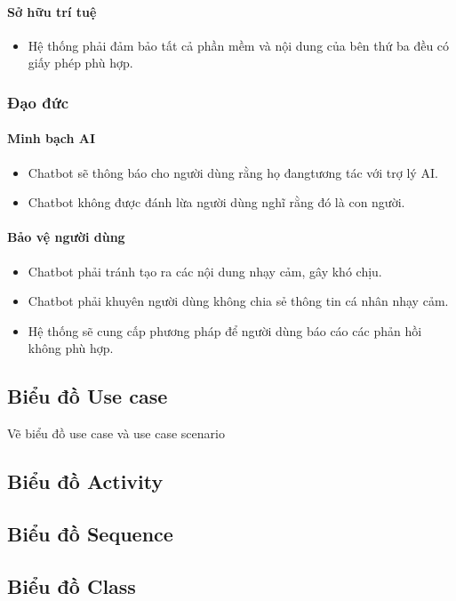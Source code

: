 \paragraph{Sở hữu trí tuệ}
\begin{itemize}
    \item Hệ thống phải đảm bảo tất cả phần mềm và nội dung của bên thứ ba đều có giấy phép phù hợp.
\end{itemize}

\subsubsection{Đạo đức}

\paragraph{Minh bạch AI}
\begin{itemize}
    \item Chatbot sẽ thông báo cho người dùng rằng họ đangtương tác với trợ lý AI.
    \item Chatbot không được đánh lừa người dùng nghĩ rằng đó là con người.
\end{itemize}

\paragraph{Bảo vệ người dùng}
\begin{itemize}
    \item Chatbot phải tránh tạo ra các nội dung nhạy cảm, gây khó chịu.
    \item Chatbot phải khuyên người dùng không chia sẻ thông tin cá nhân nhạy cảm.
    \item Hệ thống sẽ cung cấp phương pháp để người dùng báo cáo các phản hồi không phù hợp.
\end{itemize}
\subsection{Biểu đồ Use case}
Vẽ biểu đồ use case và use case scenario
\subsection{Biểu đồ Activity}
\subsection{Biểu đồ Sequence}
\subsection{Biểu đồ Class}
